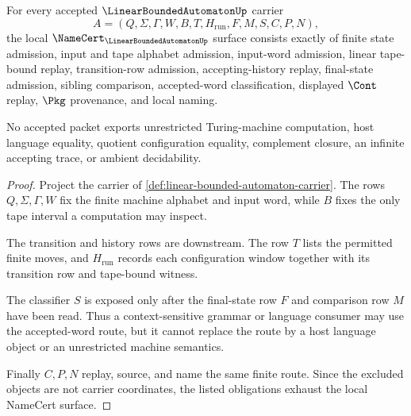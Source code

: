 \begin{theorem}
\label{thm:linear-bounded-automaton-namecert-obligations}
For every accepted $\LinearBoundedAutomatonUp$ carrier
$$
A=(Q,\Sigma,\Gamma,W,B,T,H_{\mathrm{run}},F,M,S,C,P,N),
$$
the local $\NameCert_{\LinearBoundedAutomatonUp}$ surface consists exactly of finite state admission, input and tape alphabet admission, input-word admission, linear tape-bound replay, transition-row admission, accepting-history replay, final-state admission, sibling comparison, accepted-word classification, displayed $\Cont$ replay, $\Pkg$ provenance, and local naming.

No accepted packet exports unrestricted Turing-machine computation, host language equality, quotient configuration equality, complement closure, an infinite accepting trace, or ambient decidability.
\end{theorem}
\begin{proof}
Project the carrier of \autoref{def:linear-bounded-automaton-carrier}. The rows $Q,\Sigma,\Gamma,W$ fix the finite machine alphabet and input word, while $B$ fixes the only tape interval a computation may inspect.

The transition and history rows are downstream. The row $T$ lists the permitted finite moves, and $H_{\mathrm{run}}$ records each configuration window together with its transition row and tape-bound witness.

The classifier $S$ is exposed only after the final-state row $F$ and comparison row $M$ have been read. Thus a context-sensitive grammar or language consumer may use the accepted-word route, but it cannot replace the route by a host language object or an unrestricted machine semantics.

Finally $C,P,N$ replay, source, and name the same finite route. Since the excluded objects are not carrier coordinates, the listed obligations exhaust the local NameCert surface.
\end{proof}

